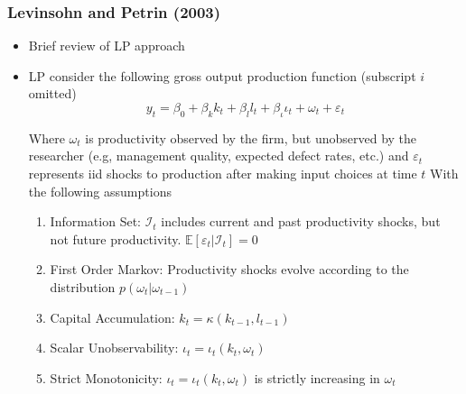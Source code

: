 \documentclass{beamer}
\begin{document}

\begin{frame}
\frametitle{Levinsohn and Petrin (2003)}
\begin{itemize}
	\item Brief review of LP approach
	
	\item LP consider the following gross output production function (subscript $i$ omitted)
	\begin{equation}
	y_{t}=\beta_{0}+\beta_{k}k_{t}+\beta_{l}l_{t}+\beta_{\iota}\iota_{t}+\omega_{t}+\varepsilon_{t}
	\end{equation}
	
	Where $\omega_{t}$ is productivity observed by the firm, but unobserved by the researcher (e.g, management quality, expected defect rates, etc.) and $\varepsilon_{t}$ represents iid shocks to production after making input choices at time $t$
	With the following assumptions
	\medskip
	\begin{enumerate}
		
		\item Information Set: $\mathcal{I}_{t}$ includes current and past productivity shocks, but not future productivity. $\mathbb{E}[\varepsilon_{t}|\mathcal{I}_{t}]=0$
		\item First Order Markov: Productivity shocks evolve according to the distribution $p(\omega_{t}|\omega_{t-1})$
		\item Capital Accumulation: $k_{t}=\kappa(k_{t-1}, l_{t-1})$
		\item Scalar Unobservability: $\iota_{t}=\iota_{t}(k_{t}, \omega_{t})$
		\item Strict Monotonicity: $\iota_{t}=\iota_{t}(k_{t}, \omega_{t})$ is strictly increasing in $\omega_{t}$
	\end{enumerate}
\end{itemize}
\end{frame}

\end{document}
